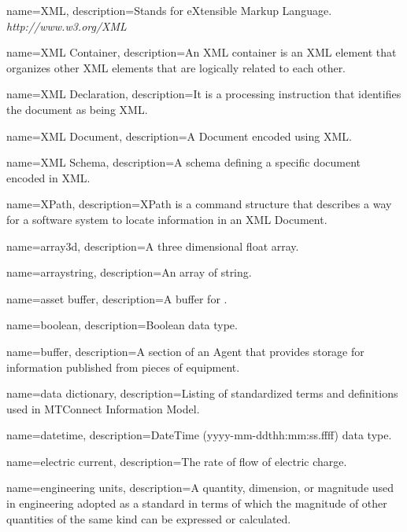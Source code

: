 {
    name={XML},
	description={Stands for eXtensible Markup Language. \textit{http://www.w3.org/XML}}
}

{
    name={XML Container},
	description={An XML container is an XML element that \glspl{organize} other XML elements that are logically related to each other. }
}

{
    name={XML Declaration},
	description={It is a processing instruction that identifies the document as being XML.}
}

{
    name={XML Document},
	description={A \gls{Document} encoded using XML.
}
}

{
    name={XML Schema},
	description={A \gls{schema} defining a specific document encoded in XML.
}
}

{
    name={XPath},
	description={\gls{XPath} is a command structure that describes a way for a software system to locate information in an \gls{XML Document}. }
}

{
    name={array3d},
	description={A three dimensional \gls{float} array.}
}

{
    name={arraystring},
	description={An array of \gls{string}.}
}

{
    name={asset buffer},
	description={A \gls{buffer} for .}
}

{
    name={boolean},
	description={Boolean data type.}
}

{
    name={buffer},
	description={A section of an \gls{Agent} that provides storage for information published from pieces of equipment.}
}

{
    name={data dictionary},
	description={Listing of standardized terms and definitions used in \gls{MTConnect Information Model}.}
}

{
    name={datetime},
	description={DateTime (yyyy-mm-ddthh:mm:ss.ffff) data type.}
}

{
    name={electric current},
	description={The rate of flow of electric charge.}
}

{
    name={engineering units},
	description={A quantity, dimension, or magnitude used in engineering adopted as a standard in terms of which the magnitude of other quantities of the same kind can be expressed or calculated.}
}

